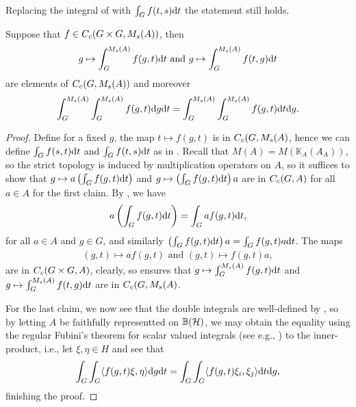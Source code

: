 \begin{corollary}
Replacing the integral of  with $\int_G f(t,s) \mathrm{d} t$ the statement still holds.
\end{corollary}
\begin{theorem}
Suppose that $f \in C_c(G \times G, M_s(A))$, then 
\begin{align*}
	g \mapsto \int_G^{M_s(A)} f(g,t) \mathrm{d} t \text{ and } g \mapsto \int_G^{M_s(A)} f(t,g) \mathrm{d} t
\end{align*}
are elements of $C_c(G,M_s(A))$ and moreover
\begin{align*}
	\int_G^{M_s(A)} \int_G^{M_s(A)} f(g,t) \mathrm{d} g \mathrm{d} t = \int_G^{M_s(A)} \int_G^{M_s(A)} f(g,t) \mathrm{d} t \mathrm{d} g.
\end{align*}
\label{int:fubini}
\end{theorem}
\begin{proof}
Define for a fixed $g$, the map $t \mapsto f(g,t)$ is in $C_c(G,M_s(A)$, hence we can define $\int_G f(s,t) \mathrm{d} t$ and $\int_G f(t,s) \mathrm{d} t$ as in . Recall that $M(A) = M(\mathbb{K}_A(A_A))$, so the strict topology is induced by multiplication operators on $A$, so it suffices to show that $g \mapsto a \left(\int_Gf(g,t) \mathrm{d} t\right)$ and $g \mapsto \left(\int_G f(g,t) \mathrm{d} t\right) a $ are in $C_c(G,A)$ for all $ a \in A$ for the first claim. By , we have 
\begin{align*}
a \left( \int_G f(g,t) \mathrm{d} t \right) = \int_G a f(g,t) \mathrm{d} t,
\end{align*}
for all $a \in A$ and $g \in G$, and similarly $\left( \int_G f(g,t) \mathrm{d} t \right)a = \int_G f(g,t) a \mathrm{d} t$. The maps 
\begin{align*}
	(g,t) \mapsto a f(g,t) \text{ and } (g,t) \mapsto f(g,t) a,
\end{align*}
are in $C_c(G \times G , A)$, clearly, so  ensures that $g \mapsto \int_G^{M_s(A)} f(g,t) \mathrm{d} t$ and $g \mapsto \int_G ^{M_s(A)} f(t,g) \mathrm{d} t$ are in $C_c(G,M_s(A)$.

For the last claim, we now see that the double integrals are well-defined by , so by letting $A$ be faithfully representted on $\mathbb{B}(\mathcal{H})$, we may obtain the equality using the regular Fubini's theorem for scalar valued integrals (see e.g., \cite{schilling}) to the inner-product, i.e., let $\xi, \eta \in H$ and see that 
\begin{align*}
	\int_G \int_G \langle f(g,t) \xi, \eta \rangle \mathrm{d} g \mathrm{d} t = \int_G \int_G \langle f(g,t) \xi_i, \xi_j \rangle \mathrm{d} t \mathrm{d} g,
\end{align*}
finishing the proof.
\end{proof}

